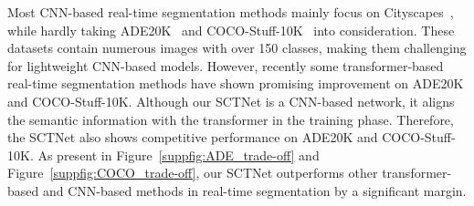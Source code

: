 \documentclass[letterpaper]{article} %
\begin{document}
Most CNN-based real-time segmentation methods mainly focus on Cityscapes~\cite{cordts2016cityscapes}, while hardly taking ADE20K~\cite{zhou2017scene} and COCO-Stuff-10K~\cite{caesar2018coco} into consideration. These datasets contain numerous images with over 150 classes, making them challenging for lightweight CNN-based models. However, recently some transformer-based real-time segmentation methods have shown promising improvement on ADE20K and COCO-Stuff-10K. Although our SCTNet is a CNN-based network, it aligns the semantic information with the transformer in the training phase. Therefore, the SCTNet also shows competitive performance on ADE20K and COCO-Stuff-10K. As present in Figure~\ref{suppfig:ADE_trade-off} and Figure~\ref{suppfig:COCO_trade-off}, our SCTNet outperforms other transformer-based and CNN-based methods in real-time segmentation by a significant margin.
\end{document}
